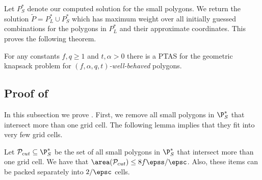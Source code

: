 {Let $P_S^*$ denote our computed solution for the small polygons.
We return the solution $\tilde P = P_L^* \cup P_S^*$ which has maximum weight over all initially guessed combinations for the polygons in $P_L^*$ and their approximate coordinates.}
This proves the following theorem. 

\begin{theorem} \label{thm:polygon} For any constants $f,q\ge1$ and $t,\alpha>0$ there is a
	\textsf{PTAS} for the geometric knapsack problem for \emph{$(f,\alpha,q, t)$-well-behaved} polygons.\end{theorem}



\subsection{Proof of }
\label{susec:smallpoly}
In this subsection we prove . First, we remove all small polygons in $\P_{S}^{*}$ that intersect more than one grid cell. The following lemma implies that they fit into very few grid cells.
\begin{lem}
	\label{lem: cut-polygon}
	Let $\mathcal{P}_{cut}\subseteq \P_{S}^{*}$ be the set of all small polygons in $\P_{S}^{*}$ that intersect more than one grid cell. We have that $\area(\mathcal{P}_{cut}) \le 8 f \epss/\epsc$. %
 Also, these items can be packed separately into $2/\epsc$ cells.
\end{lem}

